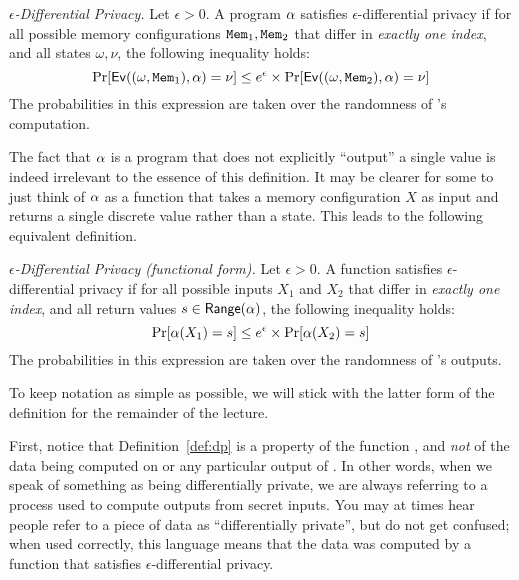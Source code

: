 \documentclass[11pt,twoside]{scrartcl}
\begin{document}
\begin{definition}{\emph{$\epsilon$-Differential Privacy.}}
\label{def:dp1}
Let $\epsilon > 0$. A program $\alpha$ satisfies $\epsilon$-differential privacy if for all possible memory configurations $\texttt{\upshape Mem}_1, \texttt{\upshape Mem}_2$ that differ in \emph{exactly one index}, and all states $\omega,\nu$, the following inequality holds:
\begin{equation}
\label{eq:ep0-1}
\mathrm{Pr}[\eval{(\omega,\pderefop_1)}{\asprg} = \nu] \le e^\epsilon \times \mathrm{Pr}[\eval{(\omega,\pderefop_2)}{\asprg} = \nu]
\end{equation}
The probabilities in this expression are taken over the randomness of \san's computation.
\end{definition}
The fact that $\alpha$ is a program that does not explicitly ``output'' a single value is indeed irrelevant to the essence of this definition. It may be clearer for some to just think of $\alpha$ as a function that takes a memory configuration $X$ as input and returns a single discrete value rather than a state. This leads to the following equivalent definition.
\begin{definition}{\emph{$\epsilon$-Differential Privacy (functional form).}}
\label{def:dp}
Let $\epsilon > 0$. A function \san satisfies $\epsilon$-differential privacy if for all possible inputs $X_1$ and $X_2$ that differ in \emph{exactly one index}, and all return values $s \in \mathsf{Range}(\alpha)$, the following inequality holds:
\begin{equation}
\label{eq:ep0-1}
\mathrm{Pr}[\san(X_1) = s] \le e^\epsilon \times \mathrm{Pr}[\san(X_2) = s]
\end{equation}
The probabilities in this expression are taken over the randomness of \san's outputs.
\end{definition}
To keep notation as simple as possible, we will stick with the latter form of the definition for the remainder of the lecture.

First, notice that Definition~\ref{def:dp} is a property of the function \san, and \emph{not} of the data being computed on or any particular output of \san. In other words, when we speak of something as being differentially private, we are always referring to a process used to compute outputs from secret inputs. You may at times hear people refer to a piece of data as ``differentially private'', but do not get confused; when used correctly, this language means that the data was computed by a function that satisfies $\epsilon$-differential privacy.
\end{document}
